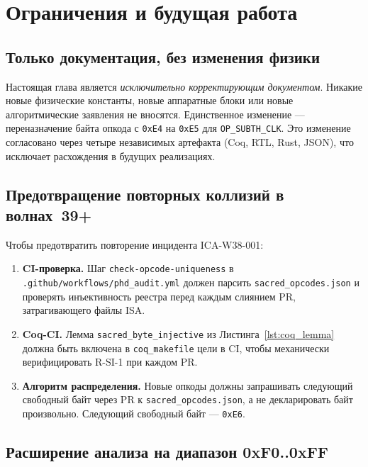 \section{Ограничения и будущая работа}
\label{sec:limitations}

\subsection{Только документация, без изменения физики}

Настоящая глава является \emph{исключительно корректирующим документом}.
Никакие новые физические константы, новые аппаратные блоки или новые
алгоритмические заявления не вносятся.  Единственное изменение —
переназначение байта опкода с \texttt{0xE4} на \texttt{0xE5} для
\texttt{OP\_SUBTH\_CLK}.  Это изменение согласовано через четыре
независимых артефакта (Coq, RTL, Rust, JSON), что исключает
расхождения в будущих реализациях.

\subsection{Предотвращение повторных коллизий в волнах~39+}

Чтобы предотвратить повторение инцидента ICA-W38-001:

\begin{enumerate}
  \item \textbf{CI-проверка.}  Шаг \texttt{check-opcode-uniqueness} в
    \texttt{.github/workflows/phd\_audit.yml} должен парсить
    \texttt{sacred\_opcodes.json} и проверять инъективность реестра
    перед каждым слиянием PR, затрагивающего файлы ISA.

  \item \textbf{Coq-CI.}  Лемма \texttt{sacred\_byte\_injective}
    из Листинга~\ref{lst:coq_lemma} должна быть включена
    в \texttt{coq\_makefile} цели в CI, чтобы механически верифицировать
    R-SI-1 при каждом PR.

  \item \textbf{Алгоритм распределения.}  Новые опкоды должны
    запрашивать следующий свободный байт через PR к
    \texttt{sacred\_opcodes.json}, а не декларировать байт
    произвольно.  Следующий свободный байт — \texttt{0xE6}.
\end{enumerate}

\subsection{Расширение анализа на диапазон 0xF0..0xFF}


